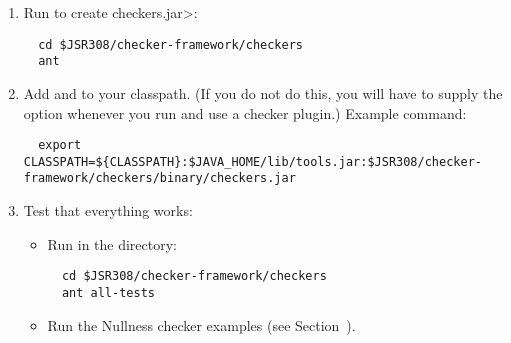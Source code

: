 \begin{enumerate}

\item
Run  to create \<checkers.jar>:

\begin{Verbatim}
  cd $JSR308/checker-framework/checkers
  ant
\end{Verbatim}

\item Add  and  to your classpath.
  (If you do not do this, you will have to supply the  option
  whenever you run  and use a checker plugin.)
  Example command:

\begin{smaller}
\begin{Verbatim}
  export CLASSPATH=${CLASSPATH}:$JAVA_HOME/lib/tools.jar:$JSR308/checker-framework/checkers/binary/checkers.jar
\end{Verbatim}
\end{smaller}

\item Test that everything works:

  \begin{itemize}

  \item Run  in the  directory:
\begin{Verbatim}
  cd $JSR308/checker-framework/checkers
  ant all-tests
\end{Verbatim}

  \item Run the Nullness checker examples (see
    Section~).

  \end{itemize}

\end{enumerate}

